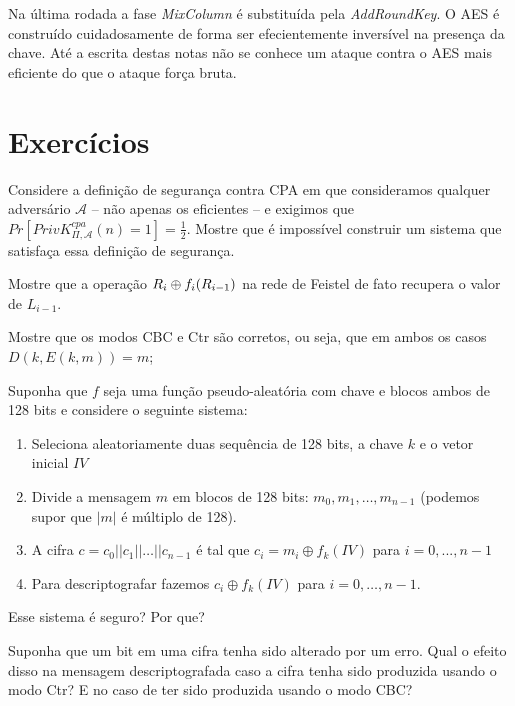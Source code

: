 Na última rodada a fase {\em MixColumn} é substituída pela {\em AddRoundKey}.
O AES é construído cuidadosamente de forma ser efecientemente inversível na presença da chave.
Até a escrita destas notas não se conhece um ataque contra o AES mais eficiente do que o ataque força bruta.




\section{Exercícios}
\label{sec:exercicios}

\begin{exercicio}
  Considere a definição de segurança contra CPA em que consideramos qualquer adversário $\mathcal{A}$ -- não apenas os eficientes -- e exigimos que $Pr[PrivK^{cpa}_{\Pi,\mathcal{A}}(n) = 1] = \frac{1}{2}$.
  Mostre que é impossível construir um sistema que satisfaça essa definição de segurança.
\end{exercicio}

\begin{exercicio}
Mostre que a operação $R_i \oplus f_i(R_{i-1})$ na rede de Feistel de fato recupera o valor de $L_{i-1}$.
\end{exercicio}

\begin{exercicio}
  Mostre que os modos CBC e Ctr são corretos, ou seja, que em ambos os casos $D(k, E(k,m)) = m$;
\end{exercicio}

\begin{exercicio}
  Suponha que $f$ seja uma função pseudo-aleatória com chave e blocos ambos de 128 bits e considere o seguinte sistema:
  \begin{enumerate}
  \item Seleciona aleatoriamente duas sequência de 128 bits, a chave $k$ e o vetor inicial $IV$
  \item Divide a mensagem $m$ em blocos de 128 bits: $m_0, m_1, \dots, m_{n-1}$ (podemos supor que $|m|$ é múltiplo de 128).
  \item A cifra $c = c_0 || c_1 || \dots || c_{n-1}$ é tal que $c_i = m_i \oplus f_k(IV)$ para $i = 0, ..., n-1$
  \item Para descriptografar fazemos $c_i \oplus f_k(IV)$ para $i = 0, \dots, n-1$.
  \end{enumerate}
  Esse sistema é seguro? Por que?
\end{exercicio}

\begin{exercicio}
Suponha que um bit em uma cifra tenha sido alterado por um erro.
Qual o efeito disso na mensagem descriptografada caso a cifra tenha sido produzida usando o modo Ctr? E no caso de ter sido produzida usando o modo CBC?  
\end{exercicio}



